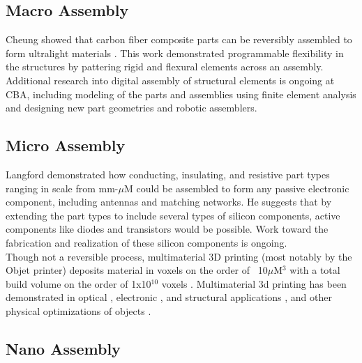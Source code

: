 {\subsection{Macro Assembly}

Cheung showed that carbon fiber composite parts can be reversibly assembled to form ultralight materials \cite{Cheung2013}.  This work demonstrated programmable flexibility in the structures by pattering rigid and flexural elements across an assembly.  Additional research into digital assembly of structural elements is ongoing at CBA, including modeling of the parts and assemblies using finite element analysis\cite{Calisch2014} and designing new part geometries and robotic assemblers\cite{Carney2015}.

\subsection{Micro Assembly}


Langford demonstrated how conducting, insulating, and resistive part types ranging in scale from mm-$\mu$M could be assembled to form any passive electronic component, including antennas and matching networks\cite{Langford2014}.  He suggests that by extending the part types to include several types of silicon components, active components like diodes and transistors would be possible.  Work toward the fabrication and realization of these silicon components is ongoing.
\\

Though not a reversible process, multimaterial 3D printing (most notably by the Objet printer) deposits material in voxels on the order of ~10$\mu$M$^{3}$ with a total build volume on the order of 1x10$^{10}$ voxels \cite{Objet1000}.  Multimaterial 3d printing has been demonstrated in optical \cite{Willis2012}, electronic \cite{Ahn2009}, and structural applications \cite{Skouras2013} \cite{Schumacher}, and other physical optimizations of objects \cite{Bacher2014}.

\subsection{Nano Assembly}

}

